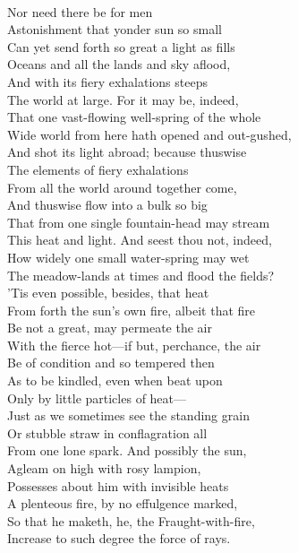 \\
Nor need there be for men\\
Astonishment that yonder sun so small\\
Can yet send forth so great a light as fills\\
Oceans and all the lands and sky aflood,\\
And with its fiery exhalations steeps\\
The world at large. For it may be, indeed,\\
That one vast-flowing well-spring of the whole\\
Wide world from here hath opened and out-gushed,\\
And shot its light abroad; because thuswise\\
The elements of fiery exhalations\\
From all the world around together come,\\
And thuswise flow into a bulk so big\\
That from one single fountain-head may stream\\
This heat and light. And seest thou not, indeed,\\
How widely one small water-spring may wet\\
The meadow-lands at times and flood the fields?\\
'Tis even possible, besides, that heat\\
From forth the sun's own fire, albeit that fire\\
Be not a great, may permeate the air\\
With the fierce hot—if but, perchance, the air\\
Be of condition and so tempered then\\
As to be kindled, even when beat upon\\
Only by little particles of heat—\\
Just as we sometimes see the standing grain\\
Or stubble straw in conflagration all\\
From one lone spark. And possibly the sun,\\
Agleam on high with rosy lampion,\\
Possesses about him with invisible heats\\
A plenteous fire, by no effulgence marked,\\
So that he maketh, he, the Fraught-with-fire,\\
Increase to such degree the force of rays.\\

